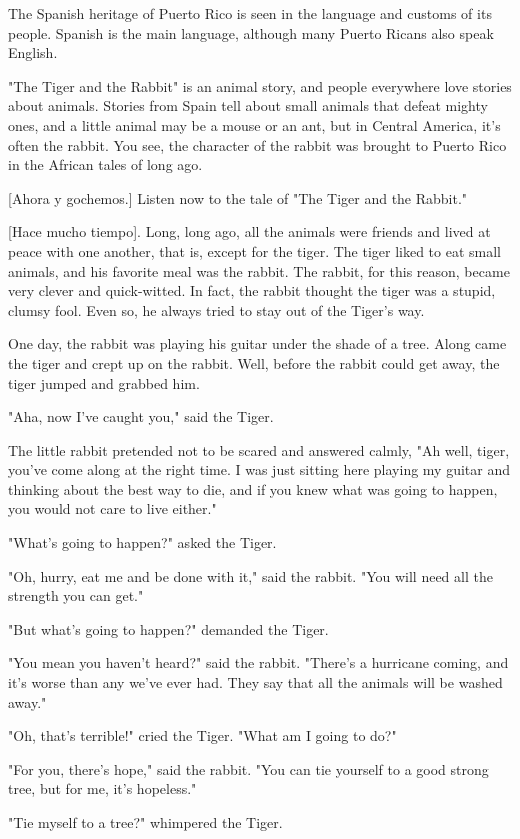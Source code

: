 The Spanish heritage of Puerto Rico is seen in the language and customs of its people. Spanish is the main language, although many Puerto Ricans also speak English.

"The Tiger and the Rabbit" is an animal story, and people everywhere love stories about animals. Stories from Spain tell about small animals that defeat mighty ones, and a little animal may be a mouse or an ant, but in Central America, it's often the rabbit. You see, the character of the rabbit was brought to Puerto Rico in the African tales of long ago.

    [Ahora y gochemos.] Listen now to the tale of "The Tiger and the Rabbit."

[Hace mucho tiempo]. Long, long ago, all the animals were friends and lived at peace with one another, that is, except for the tiger. The tiger liked to eat small animals, and his favorite meal was the rabbit. The rabbit, for this reason, became very clever and quick-witted. In fact, the rabbit thought the tiger was a stupid, clumsy fool. Even so, he always tried to stay out of the Tiger's way.

One day, the rabbit was playing his guitar under the shade of a tree. Along came the tiger and crept up on the rabbit. Well, before the rabbit could get away, the tiger jumped and grabbed him.

"Aha, now I've caught you," said the Tiger.

The little rabbit pretended not to be scared and answered calmly, "Ah well, tiger, you've come along at the right time. I was just sitting here playing my guitar and thinking about the best way to die, and if you knew what was going to happen, you would not care to live either."

"What's going to happen?" asked the Tiger.

"Oh, hurry, eat me and be done with it," said the rabbit. "You will need all the strength you can get."

"But what's going to happen?" demanded the Tiger.

"You mean you haven't heard?" said the rabbit. "There's a hurricane coming, and it's worse than any we've ever had. They say that all the animals will be washed away."

"Oh, that's terrible!" cried the Tiger. "What am I going to do?"

"For you, there's hope," said the rabbit. "You can tie yourself to a good strong tree, but for me, it's hopeless."

"Tie myself to a tree?" whimpered the Tiger.

